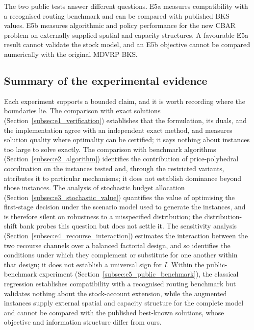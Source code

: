\documentclass[authoryear,final,3p,times]{elsarticle}
\theoremstyle{definition}
\theoremstyle{plain}
\begin{document}
The two public tests answer different questions. E5a measures compatibility
with a recognised routing benchmark and can be compared with published BKS
values. E5b measures algorithmic and policy performance for the new CBAR
problem on externally supplied spatial and capacity structures. A favourable
E5a result cannot validate the stock model, and an E5b objective cannot be
compared numerically with the original MDVRP BKS.

\subsection{Summary of the experimental evidence}
\label{subsec:claims_evidence}

Each experiment supports a bounded claim, and it is worth recording where the
boundaries lie. The comparison with exact solutions
(Section~\ref{subsec:e1_verification}) establishes that the formulation, its
duals, and the implementation agree with an independent exact method, and
measures solution quality where optimality can be certified; it says nothing
about instances too large to solve exactly. The comparison with benchmark
algorithms (Section~\ref{subsec:e2_algorithm}) identifies the contribution of
price-polyhedral coordination on the instances tested and, through the
restricted variants, attributes it to particular mechanisms; it does not
establish dominance beyond those instances. The analysis of stochastic budget
allocation (Section~\ref{subsec:e3_stochastic_value}) quantifies the value of
optimising the first-stage decision under the scenario model used to generate
the instances, and is therefore silent on robustness to a misspecified
distribution; the distribution-shift bank probes this question but does not
settle it. The sensitivity analysis
(Section~\ref{subsec:e4_recourse_interaction}) estimates the interaction
between the two recourse channels over a balanced factorial design, and so
identifies the conditions under which they complement or substitute for one
another within that design; it does not establish a universal sign for $I$.
Within the public-benchmark experiment
(Section~\ref{subsec:e5_public_benchmark}), the classical regression
establishes compatibility with a recognised routing benchmark but validates
nothing about the stock-account extension, while the augmented instances
supply external spatial and capacity structure for the complete model and
cannot be compared with the published best-known solutions, whose objective
and information structure differ from ours.
\end{document}
